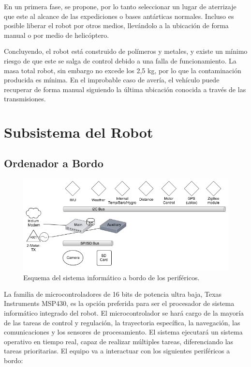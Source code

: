 \documentclass[a4paper,12pt]{article}
\begin{document}
En un primera fase, se propone, por lo tanto seleccionar un lugar de aterrizaje que este al alcance de las expediciones o bases antárticas normales. Incluso es posible liberar el robot por otros medios, llevándolo a la ubicación de forma manual o por medio de helicóptero.

Concluyendo, el robot está construido de polímeros y metales, y existe un mínimo  riesgo de que este se salga de control debido a una falla de funcionamiento. La masa total robot, sin embargo no excede los 2,5 kg, por lo que la contaminación producida es mínima. En el improbable caso de avería, el vehículo puede recuperar de forma manual siguiendo la última ubicación conocida a través de las transmisiones.




\section{Subsistema del Robot}

\subsection{Ordenador a Bordo}
\begin{figure}[h!]
	\centering
    \includegraphics[width=1\textwidth]{schema}
    \caption{Esquema del sistema informático a bordo de los periféricos.}
\end{figure} 
La familia de microcontroladores de 16 bits de potencia ultra baja, Texas Instruments MSP430, es la opción preferida para ser el procesador de sistema informático integrado del robot. El microcontrolador se hará cargo de la mayoría de las tareas de control y regulación, la trayectoria específica, la navegación, las comunicaciones y los sensores de procesamiento. El sistema ejecutará un sistema operativo en tiempo real, capaz de realizar múltiples tareas, diferenciando las tareas prioritarias. El equipo va a interactuar con los siguientes periféricos a bordo:
\end{document}
